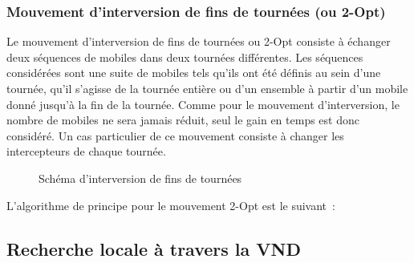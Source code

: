 		\subsubsection{Mouvement d'interversion de fins de tournées (ou 2-Opt)}
			Le mouvement d'interversion de fins de tournées ou 2-Opt consiste à échanger deux séquences de mobiles dans deux tournées différentes. Les séquences considérées sont une suite de mobiles tels qu'ils ont été définis au sein d'une tournée, qu'il s'agisse de la tournée entière ou d'un ensemble à partir d'un mobile donné jusqu'à la fin de la tournée. Comme pour le mouvement d'interversion, le nombre de mobiles ne sera jamais réduit, seul le gain en temps est donc considéré. Un cas particulier de ce mouvement consiste à changer les intercepteurs de chaque tournée.

			\begin{figure}[h!]
			\centering
			\begin{tikzpicture}[schema]
				
			\end{tikzpicture}
			\caption{Schéma d'interversion de fins de tournées}
			\label{fig:move_2opt}
			\end{figure}

			\newpage
			L'algorithme de principe pour le mouvement 2-Opt est le suivant :
			\begin{code}
				\begin{algo}[informal]
					\BEGIN
									\ENDFORGEN
								\ENDFORGEN
							\ENDFORGEN
						\ENDFORGEN
					\END
				\end{algo}
			\end{code}


		\subsection{Recherche locale à travers la VND}

